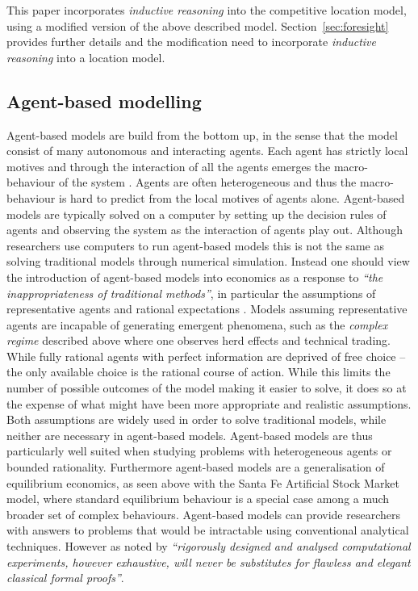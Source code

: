 \documentclass[preprint, 12pt]{elsarticle}
\begin{document}
This paper incorporates \emph{inductive reasoning} into the competitive location model, using a modified version of the above described model. Section~\ref{sec:foresight} provides further details and the modification need to incorporate \emph{inductive reasoning} into a location model.

\subsection{Agent-based modelling}

Agent-based models are build from the bottom up, in the sense that the model consist of many autonomous and interacting agents. Each agent has strictly local motives and through the interaction of all the agents emerges the macro-behaviour of the system \citep[chapter~2]{Ehrentreich_2007}. Agents are often heterogeneous and thus the macro-behaviour is hard to predict from the local motives of agents alone. Agent-based models are typically solved on a computer by setting up the decision rules of agents and observing the system as the interaction of agents play out. Although researchers use computers to run agent-based models this is not the same as solving traditional models through numerical simulation. Instead one should view the introduction of agent-based models into economics as a response to \emph{``the inappropriateness of traditional methods''}, in particular the assumptions of representative agents and rational expectations \citep[chapter~2, p.~7]{Ehrentreich_2007}. Models assuming representative agents are incapable of generating emergent phenomena, such as the \emph{complex regime} described above where one observes herd effects and technical trading. While fully rational agents with perfect information are deprived of free choice -- the only available choice is the rational course of action. While this limits the number of possible outcomes of the model making it easier to solve, it does so at the expense of what might have been more appropriate and realistic assumptions. Both assumptions are widely used in order to solve traditional models, while neither are necessary in agent-based models. Agent-based models are thus particularly well suited when studying problems with heterogeneous agents or bounded rationality. Furthermore agent-based models are a generalisation of equilibrium economics, as seen above with the Santa Fe Artificial Stock Market model, where standard equilibrium behaviour is a special case among a much broader set of complex behaviours. Agent-based models can provide researchers with answers to problems that would be intractable using conventional analytical techniques. However as noted by \citet[p.~viii]{Laver_Sergenti_2011} \emph{``rigorously designed and analysed computational experiments, however exhaustive, will never be substitutes for flawless and elegant classical formal proofs''}. 
\end{document}

